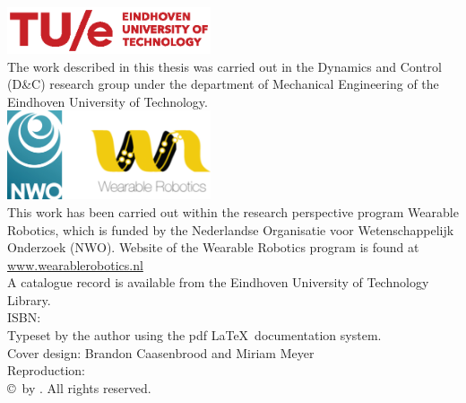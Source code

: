 \thispagestyle{empty}
\vspace*{30mm}\noindent
\begin{center}
{\LARGE\sf\maintitle}\\[4.5cm] %
{\Large\sf \@author}
\end{center}

\newpage
\thispagestyle{empty}

\vspace*{\fill}

\hspace*{-7mm}\includegraphics[width=6cm]{./img/TUeLOG_new.eps}\\
{\small The work described in this thesis was carried out in the Dynamics and Control (D\&C) research group under the department of Mechanical Engineering of the Eindhoven University of Technology. }\\[8mm]

\hspace*{-4mm}\includegraphics[width=6cm]{./img/NWO_WR.png}\\[2mm]
\noindent\bgroup\small
This work has been carried out within the research perspective program Wearable Robotics, which is funded by the Nederlandse Organisatie voor Wetenschappelijk Onderzoek (NWO). Website of the Wearable Robotics program is found at \url{www.wearablerobotics.nl} \\[.5mm]

\noindent\bgroup\small
A catalogue record is available from the Eindhoven University of Technology Library.\\
ISBN: \isbn\\[4mm]
Typeset by the author using the pdf \LaTeX \ documentation system.\\
Cover design: Brandon Caasenbrood and Miriam Meyer \\
Reproduction: \printer\\[8mm]
\copyright\year\, by \@author. All rights reserved.}
\egroup


